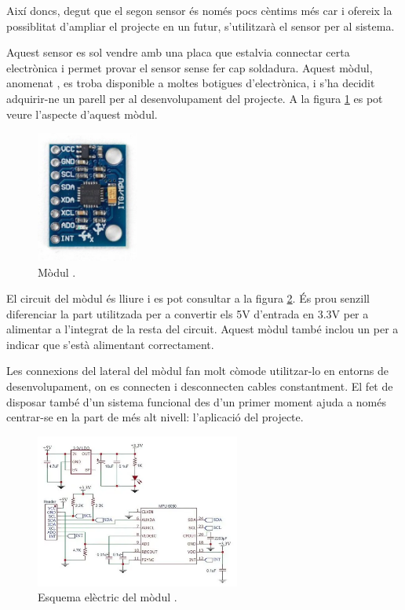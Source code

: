 Així doncs, degut que el segon sensor és només pocs cèntims més car i ofereix
la possiblitat d'ampliar el projecte en un futur, s'utilitzarà el sensor
 per al sistema.

Aquest sensor es sol vendre amb una placa que estalvia connectar
certa electrònica i permet provar el sensor sense fer cap soldadura.
Aquest mòdul, anomenat , es troba disponible a moltes botigues
d'electrònica, i s'ha decidit adquirir-ne un parell per al desenvolupament del
projecte. A la figura \ref{fig:gy521img} es pot veure l'aspecte d'aquest mòdul.

\begin{figure}[ht]
    \centering
    \includegraphics[width=0.3\textwidth]{images/modules/gy521img.jpg}
    \caption{Mòdul  \cite{gy521}.}
    \label{fig:gy521img}
\end{figure}

El circuit del mòdul  és lliure i es pot consultar a la figura
\ref{fig:gy521sch}. És prou senzill diferenciar la part utilitzada per a
convertir els 5V d'entrada en 3.3V per a alimentar a l'integrat de la resta
del circuit. Aquest mòdul també inclou un  per a indicar que s'està
alimentant correctament.

Les connexions del lateral del mòdul fan molt còmode utilitzar-lo en entorns de
desenvolupament, on es connecten i desconnecten cables constantment. El fet
de disposar també d'un sistema funcional des d'un primer moment ajuda a
només centrar-se en la part de més alt nivell: l'aplicació del projecte.

\begin{figure}[ht]
    \centering
    \includegraphics[width=0.6\textwidth]{images/modules/gy521sch.png}
    \caption{Esquema elèctric del mòdul  \cite{gy521}.}
    \label{fig:gy521sch}
\end{figure}

